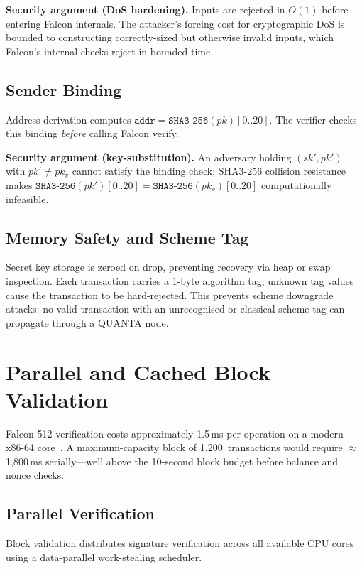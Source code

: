 \documentclass[11pt,a4paper]{article}
\begin{document}
\textbf{Security argument (DoS hardening).}
Inputs are rejected in $O(1)$ before entering Falcon internals.
The attacker's forcing cost for cryptographic DoS is bounded to
constructing correctly-sized but otherwise invalid inputs, which Falcon's
internal checks reject in bounded time.

\subsection{Sender Binding}

Address derivation computes $\texttt{addr} = \texttt{SHA3-256}(pk)[0..20]$.
The verifier checks this binding \emph{before} calling Falcon verify.

\textbf{Security argument (key-substitution).}
An adversary holding $(sk', pk')$ with $pk' \neq pk_v$ cannot satisfy the
binding check; SHA3-256 collision resistance makes
$\texttt{SHA3-256}(pk')[0..20] = \texttt{SHA3-256}(pk_v)[0..20]$
computationally infeasible.

\subsection{Memory Safety and Scheme Tag}

Secret key storage is zeroed on drop, preventing recovery via heap or swap
inspection. Each transaction carries a 1-byte algorithm tag; unknown tag
values cause the transaction to be hard-rejected. This prevents scheme
downgrade attacks: no valid transaction with an unrecognised or
classical-scheme tag can propagate through a QUANTA node.

\section{Parallel and Cached Block Validation}
\label{sec:parallel}

Falcon-512 verification costs approximately 1.5\,ms per operation on a
modern x86-64 core~\cite{pornin2022}. A maximum-capacity block of
1,200~transactions would require $\approx$1,800\,ms serially---well above
the 10-second block budget before balance and nonce checks.

\subsection{Parallel Verification}

Block validation distributes signature verification across all available
CPU cores using a data-parallel work-stealing scheduler.
\end{document}
